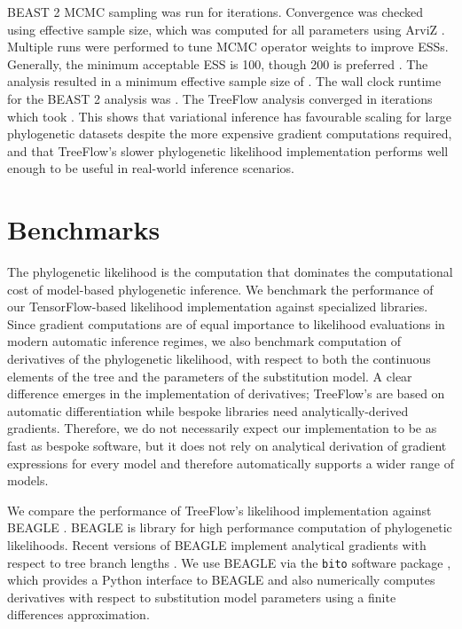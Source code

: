BEAST 2 MCMC sampling was run for  iterations. Convergence was checked using effective sample size, which was computed for all parameters using ArviZ \cite{kumar2019arviz}. Multiple runs were performed to tune MCMC operator weights to improve ESSs. Generally, the minimum acceptable ESS is 100, though 200 is preferred \cite{drummond2015bayesian}. The analysis resulted in a minimum effective sample size of . The wall clock runtime for the BEAST 2 analysis was . The TreeFlow analysis converged in  iterations which took . This shows that variational inference has favourable scaling for large phylogenetic datasets despite the more expensive gradient computations required, and that TreeFlow's slower phylogenetic likelihood implementation performs well enough to be useful in real-world inference scenarios.

\section{Benchmarks}

The phylogenetic likelihood is the computation that dominates the computational cost of model-based phylogenetic inference. We benchmark the performance of our TensorFlow-based likelihood implementation against specialized libraries. Since gradient computations are of equal importance to likelihood evaluations in modern automatic inference regimes, we also benchmark computation of derivatives of the phylogenetic likelihood, with respect to both the continuous elements of the tree and the parameters of the substitution model. A clear difference emerges in the implementation of derivatives; TreeFlow's are based on automatic differentiation while bespoke libraries need analytically-derived gradients. Therefore, we do not necessarily expect our implementation to be as fast as bespoke software, but it does not rely on analytical derivation of gradient expressions for every model and therefore automatically supports a wider range of models.

We compare the performance of TreeFlow's likelihood implementation against BEAGLE \cite{ayres2019beagle}. BEAGLE is library for high performance computation of phylogenetic likelihoods. Recent versions of BEAGLE implement analytical gradients with respect to tree branch lengths \cite{ji2020gradients}. We use BEAGLE via the \texttt{bito} software package \cite{bito}, which provides a Python interface to BEAGLE and also numerically computes derivatives with respect to substitution model parameters using a finite differences approximation.


